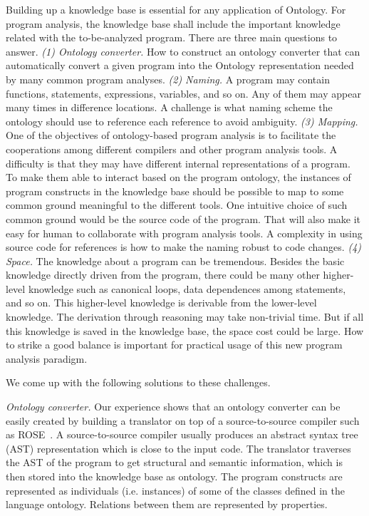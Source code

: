 \vspace*{.1in} 
Building up a knowledge base is essential for any application of
Ontology. For program analysis, the knowledge base shall include the
important knowledge related with the to-be-analyzed program. There are
three main questions to answer.  {\em (1) Ontology converter.} How to
construct an ontology converter that can automatically convert a given
program into the Ontology representation needed by many common program
analyses.  {\em (2) Naming.}  A program may contain functions,
statements, expressions, variables, and so on.  Any of them may appear
many times in difference locations. A challenge is what naming scheme
the ontology should use to reference each reference to avoid
ambiguity. {\em (3) Mapping.} One of the objectives of ontology-based
program analysis is to facilitate the cooperations among different
compilers and other program analysis tools. A difficulty is that they
may have different internal representations of a program.  To make
them able to interact based on the program ontology, the instances of
program constructs in the knowledge base should be possible to map to
some common ground meaningful to the different tools. One intuitive
choice of such common ground would be the source code of the
program. That will also make it easy for human to collaborate with
program analysis tools.  A complexity in using source code for
references is how to make the naming robust to code changes.  {\em (4)
  Space.} The knowledge about a program can be tremendous. Besides the
basic knowledge directly driven from the program, there could be many
other higher-level knowledge such as canonical loops, data dependences
among statements, and so on. This higher-level knowledge is derivable
from the lower-level knowledge. The derivation through reasoning may
take non-trivial time. But if all this knowledge is saved in the
knowledge base, the space cost could be large. How to strike a good
balance is important for practical usage of this new program analysis
paradigm.

\vspace*{.1in} 
We come up with the following solutions to these
challenges. 

{\em Ontology converter.} Our experience shows that an ontology
converter can be easily created by building a translator on top of a
source-to-source compiler such as ROSE~\cite{ROSE}.  A
source-to-source compiler usually produces an abstract syntax tree
(AST) representation which is close to the input code. The translator
traverses the AST of the program to get structural and semantic
information, which is then stored into the knowledge base as
ontology. The program constructs are represented as individuals
(i.e. instances) of some of the classes defined in the language
ontology. Relations between them are represented by properties.

